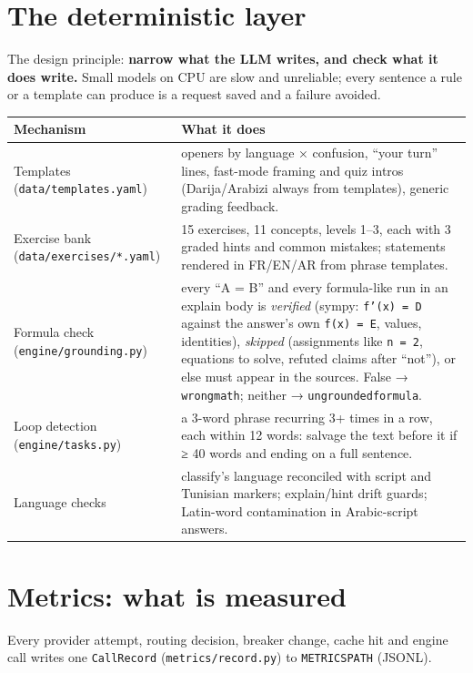 \documentclass[11pt,a4paper]{article}
\renewcommand{\_}{\origus\allowbreak}
\begin{document}
\section{The deterministic layer}

The design principle: \textbf{narrow what the LLM writes, and check what it does write.} Small models
on CPU are slow and unreliable; every sentence a rule or a template can produce is a request saved
and a failure avoided.

\begin{tabularx}{\linewidth}{@{}L{4.4cm} Y@{}}
\toprule
\textbf{Mechanism} & \textbf{What it does}\\
\midrule
Templates (\texttt{data/templates.yaml}) & openers by language × confusion, ``your turn'' lines, fast-mode framing and quiz intros (Darija/Arabizi always from templates), generic grading feedback.\\
Exercise bank (\texttt{data/exercises/*.yaml}) & 15 exercises, 11 concepts, levels 1–3, each with 3 graded hints and common mistakes; statements rendered in FR/EN/AR from phrase templates.\\
Formula check (\texttt{engine/grounding.py}) & every ``A = B'' and every formula-like run in an explain body is \emph{verified} (sympy: \texttt{f'(x) = D} against the answer's own \texttt{f(x) = E}, values, identities), \emph{skipped} (assignments like \texttt{n = 2}, equations to solve, refuted claims after ``not''), or else must appear in the sources. False → \texttt{wrong\_math}; neither → \texttt{ungrounded\_formula}.\\
Loop detection (\texttt{engine/tasks.py}) & a 3-word phrase recurring 3+ times in a row, each within 12 words: salvage the text before it if ≥ 40 words and ending on a full sentence.\\
Language checks & classify's language reconciled with script and Tunisian markers; explain/hint drift guards; Latin-word contamination in Arabic-script answers.\\
\bottomrule
\end{tabularx}

\section{Metrics: what is measured}

Every provider attempt, routing decision, breaker change, cache hit and engine call writes one
\texttt{CallRecord} (\texttt{metrics/record.py}) to \texttt{METRICS\_PATH} (JSONL).
\end{document}
